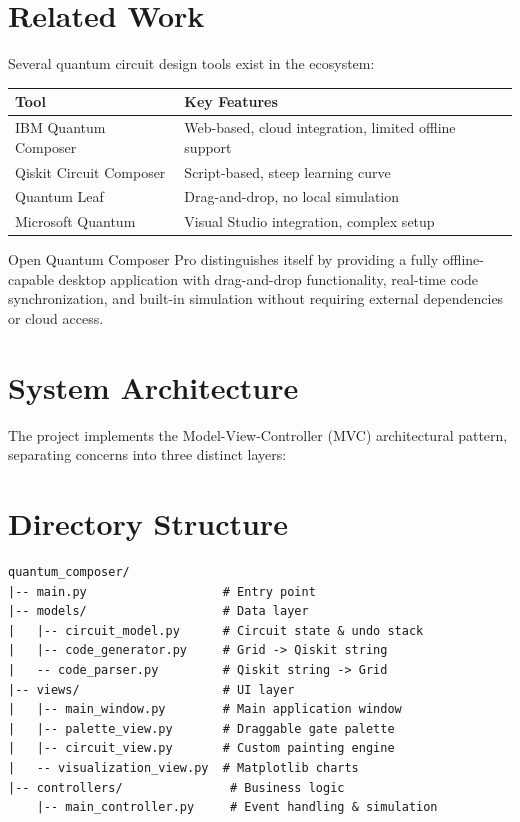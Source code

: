 \documentclass[12pt, a4paper, oneside]{report}
\theoremstyle{plain}
\theoremstyle{definition}
\theoremstyle{remark}
\begin{document}
\section{Related Work}

Several quantum circuit design tools exist in the ecosystem:

\begin{table}[h]
	\centering
	\begin{tabularx}{\linewidth}{lX}
		\toprule
		\textbf{Tool}           & \textbf{Key Features}                                 \\
		\midrule
		IBM Quantum Composer    & Web-based, cloud integration, limited offline support \\
		Qiskit Circuit Composer & Script-based, steep learning curve                    \\
		Quantum Leaf            & Drag-and-drop, no local simulation                    \\
		Microsoft Quantum       & Visual Studio integration, complex setup              \\
		\bottomrule
	\end{tabularx}
\end{table}

Open Quantum Composer Pro distinguishes itself by providing a fully offline-capable desktop application with drag-and-drop functionality, real-time code synchronization, and built-in simulation without requiring external dependencies or cloud access.

\section{System Architecture}

The project implements the Model-View-Controller (MVC) architectural pattern, separating concerns into three distinct layers:

\section{Directory Structure}

\begin{verbatim}
quantum_composer/
|-- main.py                   # Entry point
|-- models/                   # Data layer
|   |-- circuit_model.py      # Circuit state & undo stack
|   |-- code_generator.py     # Grid -> Qiskit string
|   -- code_parser.py         # Qiskit string -> Grid
|-- views/                    # UI layer
|   |-- main_window.py        # Main application window
|   |-- palette_view.py       # Draggable gate palette
|   |-- circuit_view.py       # Custom painting engine
|   -- visualization_view.py  # Matplotlib charts
|-- controllers/               # Business logic
    |-- main_controller.py     # Event handling & simulation
\end{verbatim}
\end{document}
